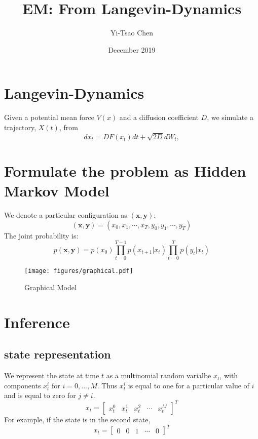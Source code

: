 \documentclass[journal=jpcbfk,manuscript=article,layout=singlecolumn,articletitle=true]{achemso}
\title{EM: From Langevin-Dynamics}
\author{Yi-Tsao Chen}
\date{December 2019}
\begin{document}
 
\maketitle

\section{Langevin-Dynamics}
Given a potential mean force $V(x)$ and a diffusion coefficient $D$, we simulate a trajectory, $X(t)$, from
\begin{equation}
\label{eq:ODLD}
dx_t=D F(x_t)dt  + \sqrt{2D}d{W}_t,
\end{equation}

\section{Formulate the problem as Hidden Markov Model}
We denote a particular configuration as $(\textbf{x}, \textbf{y})$:
\begin{equation}
(\textbf{x}, \textbf{y})=(x_0, x_1, \cdots, x_T, y_0, y_1, \cdots, y_T)
\end{equation}
The joint probability is:
\begin{equation}
p(\textbf{x}, \textbf{y})= p(x_0)\prod_{t=0}^{T-1} p(x_{t+1}|x_t) \prod_{t=0}^{T}p(y_t|x_t)
\end{equation}

\begin{figure}[h]
\texttt{[image: figures/graphical.pdf]}
\caption[Graphical Model]{Graphical Model}
\label{domaindecomp}
\end{figure}

\section{Inference}
\subsection{state representation}
We represent the state at time $t$ as a multinomial random varialbe $x_{t}$, with components $x_t^i$ for $i=0,...,M$. Thus $x_t^i$ is equal to one for a particular value of $i$ and is equal to zero for $j \neq i$.
\begin{equation}
x_t = 
\begin{bmatrix}
x_t^0 & x_t^1 & x_t^2 &\cdots & x_t^M
\end{bmatrix}^T
\end{equation}
For example, if the state is in the second state, 
\begin{equation}
x_t = 
\begin{bmatrix}
0 & 0 & 1 & \cdots & 0
\end{bmatrix}^T
\end{equation}
\end{document}
